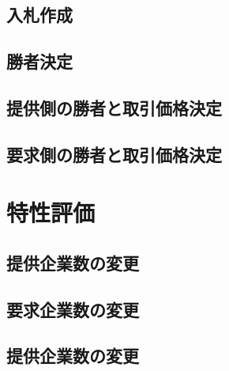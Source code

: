 \hypertarget{ux5165ux672dux4f5cux6210-2}{%
\subsection{入札作成}\label{ux5165ux672dux4f5cux6210-2}}

\hypertarget{ux52ddux8005ux6c7aux5b9a}{%
\subsection{勝者決定}\label{ux52ddux8005ux6c7aux5b9a}}

\hypertarget{ux63d0ux4f9bux5074ux306eux52ddux8005ux3068ux53d6ux5f15ux4fa1ux683cux6c7aux5b9a}{%
\subsection{提供側の勝者と取引価格決定}\label{ux63d0ux4f9bux5074ux306eux52ddux8005ux3068ux53d6ux5f15ux4fa1ux683cux6c7aux5b9a}}

\hypertarget{ux8981ux6c42ux5074ux306eux52ddux8005ux3068ux53d6ux5f15ux4fa1ux683cux6c7aux5b9a}{%
\subsection{要求側の勝者と取引価格決定}\label{ux8981ux6c42ux5074ux306eux52ddux8005ux3068ux53d6ux5f15ux4fa1ux683cux6c7aux5b9a}}

\hypertarget{ux7279ux6027ux8a55ux4fa1-1}{%
\section{特性評価}\label{ux7279ux6027ux8a55ux4fa1-1}}

\hypertarget{ux63d0ux4f9bux4f01ux696dux6570ux306eux5909ux66f4}{%
\subsection{提供企業数の変更}\label{ux63d0ux4f9bux4f01ux696dux6570ux306eux5909ux66f4}}

\hypertarget{ux8981ux6c42ux4f01ux696dux6570ux306eux5909ux66f4}{%
\subsection{要求企業数の変更}\label{ux8981ux6c42ux4f01ux696dux6570ux306eux5909ux66f4}}

\hypertarget{ux63d0ux4f9bux4f01ux696dux6570ux306eux5909ux66f4-1}{%
\subsection{提供企業数の変更}\label{ux63d0ux4f9bux4f01ux696dux6570ux306eux5909ux66f4-1}}

